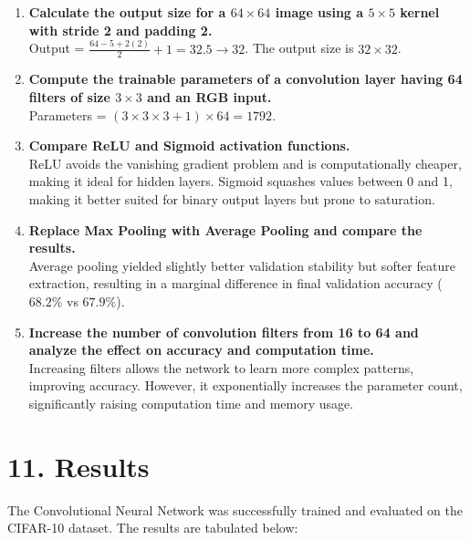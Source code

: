 \documentclass[11pt]{article}
\begin{document}
\begin{enumerate}
\item \textbf{Calculate the output size for a $64\times64$ image using a $5\times5$ kernel with stride 2 and padding 2.} \\[2mm]
Output = $\frac{64 - 5 + 2(2)}{2} + 1 = 32.5 \rightarrow 32$. The output size is $32\times32$.

\vspace{1mm}
\item \textbf{Compute the trainable parameters of a convolution layer having 64 filters of size $3\times3$ and an RGB input.} \\[2mm]
Parameters = $(3 \times 3 \times 3 + 1) \times 64 = 1792$.

\vspace{1mm}
\item \textbf{Compare ReLU and Sigmoid activation functions.} \\[2mm]
ReLU avoids the vanishing gradient problem and is computationally cheaper, making it ideal for hidden layers. Sigmoid squashes values between 0 and 1, making it better suited for binary output layers but prone to saturation.

\vspace{1mm}
\item \textbf{Replace Max Pooling with Average Pooling and compare the results.} \\[2mm]
Average pooling yielded slightly better validation stability but softer feature extraction, resulting in a marginal difference in final validation accuracy ($68.2\%$ vs $67.9\%$).

\vspace{1mm}
\item \textbf{Increase the number of convolution filters from 16 to 64 and analyze the effect on accuracy and computation time.} \\[2mm]
Increasing filters allows the network to learn more complex patterns, improving accuracy. However, it exponentially increases the parameter count, significantly raising computation time and memory usage.
\end{enumerate}

\section*{11. Results}

The Convolutional Neural Network was successfully trained and evaluated on the CIFAR-10 dataset. The results are tabulated below:
\end{document}
